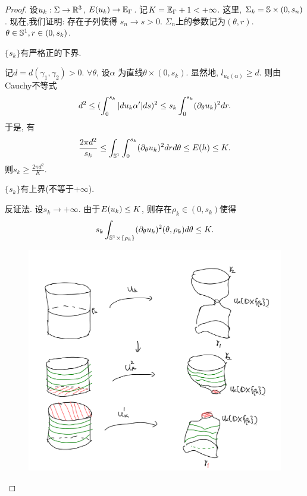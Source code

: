 \begin{proof}
    设$u_k: \Sigma \to \R^3$, $E(u_k) \to \EE_{\Gamma}$.  记$K=\EE_{\Gamma}+1 < +\infty$. 这里, $\Sigma_k = \S\times (0,s_n)$. 现在,我们证明: 存在子列使得 $s_n \to s >0$.  $\Sigma_n$上的参数记为$(\theta,r)$. $\theta \in \S^1, r \in (0,s_k)$.
    \begin{claim}
        $\{s_k\}$有严格正的下界.
        \begin{subproof}
            记$d=d(\gamma_1,\gamma_2)>0$. $\forall \theta$, 设$\alpha$ 为直线$\theta \times (0, s_k)$. 显然地, $l_{u_k(\alpha)} \ge d$. 则由Cauchy不等式
            \begin{equation}
                d^2 \le (\int^{s_k}_0 \abs{du_k \alpha'} ds)^2 \le s_k \int^{s_k}_0 (\PTT{u_k})^2dr.
            \end{equation}
            于是, 有
            \begin{equation}
                \frac{2\pi d^2}{s_k} \le \int_{\S^1}\int^{s_k}_0 (\PTT{u_k})^2 drd\theta \le E(h) \le K.
            \end{equation}
            则$s_k \ge \frac{2\pi d^2}{K}$.
        \end{subproof}
    \end{claim}
    \begin{claim}
        $\{s_k\}$有上界(不等于$+\infty$).
        \begin{subproof}
            反证法.  设$s_k \to +\infty$. 由于$\E(u_k) \le K$,  则存在$\rho_k \in (0, s_k)$使得
            \begin{equation}
                s_k\int_{\S^1 \times \{\rho_k\}} (\PTT{u_k})^2(\theta,\rho_k) d\theta \le K.
            \end{equation}
            \begin{figure}[!h]
                \centering
                \includegraphics[scale=0.6]{images/closed_degenerate.png}

\end{figure}
\end{subproof}
\end{claim}
\end{proof}
